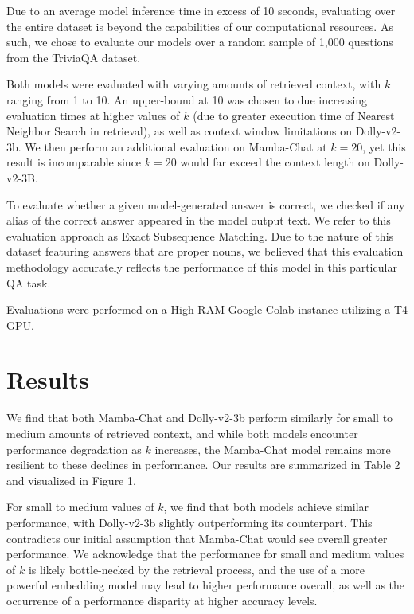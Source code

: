 \documentclass[11pt]{article}
\begin{document}
Due to an average model inference time in excess of 10 seconds, evaluating over the entire dataset is beyond the capabilities of our computational resources. As such, we chose to evaluate our models over a random sample of 1,000 questions from the TriviaQA dataset.

Both models were evaluated with varying amounts of retrieved context, with $k$ ranging from 1 to 10. An upper-bound at 10 was chosen to due increasing evaluation times at higher values of $k$ (due to greater execution time of Nearest Neighbor Search in retrieval), as well as context window limitations on Dolly-v2-3b. We then perform an additional evaluation on Mamba-Chat at $k=20$, yet this result is incomparable since $k=20$ would far exceed the context length on Dolly-v2-3B.

To evaluate whether a given model-generated answer is correct, we checked if any alias of the correct answer appeared in the model output text. We refer to this evaluation approach as Exact Subsequence Matching. Due to the nature of this dataset featuring answers that are proper nouns, we believed that this evaluation methodology accurately reflects the performance of this model in this particular QA task.

Evaluations were performed on a High-RAM Google Colab instance utilizing a T4 GPU.
\section{Results}
We find that both Mamba-Chat and Dolly-v2-3b perform similarly for small to medium amounts of retrieved context, and while both models encounter performance degradation as $k$ increases, the Mamba-Chat model remains more resilient to these declines in performance. Our results are summarized in Table 2 and visualized in Figure 1.

For small to medium values of $k$, we find that both models achieve similar performance, with Dolly-v2-3b slightly outperforming its counterpart. This contradicts our initial assumption that Mamba-Chat would see overall greater performance. We acknowledge that the performance for small and medium values of $k$ is likely bottle-necked by the retrieval process, and the use of a more powerful embedding model may lead to higher performance overall, as well as the occurrence of a performance disparity at higher accuracy levels.
\end{document}
